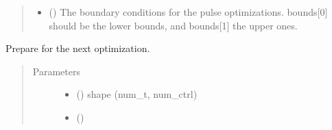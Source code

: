 \documentclass[letterpaper,10pt,english]{sphinxmanual}
\begin{document}
\begin{fulllineitems}
\begin{quote}
\begin{description}
\begin{itemize}
\item {} 
 (\sphinxstyleliteralemphasis{\sphinxupquote{, }}\sphinxstyleliteralemphasis{\sphinxupquote{ (}}\sphinxstyleliteralemphasis{\sphinxupquote{, }}\sphinxstyleliteralemphasis{\sphinxupquote{, }}\sphinxstyleliteralemphasis{\sphinxupquote{)}}) \textendash{} The boundary conditions for the pulse optimizations. bounds{[}0{]} should be
the lower bounds, and bounds{[}1{]} the upper ones.

\end{itemize}

\end{description}\end{quote}

\begin{fulllineitems}
\label{\detokenize{qsim:qsim.optimize.SimulatedAnnealing.prepare_optimization}}
Prepare for the next optimization.
\begin{quote}\begin{description}
\item[{Parameters}] \leavevmode\begin{itemize}
\item {} 
 () \textendash{} shape (num\_t, num\_ctrl)

\item {} 
 () \textendash{} 

\end{itemize}

\end{description}\end{quote}

\end{fulllineitems}


\end{fulllineitems}
\end{document}
